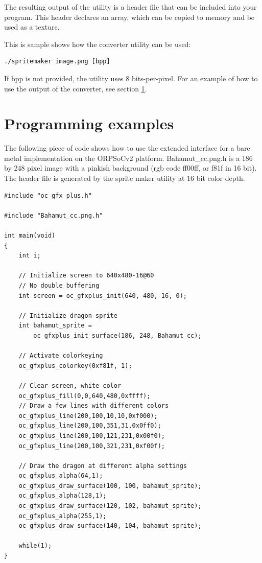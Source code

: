 \documentclass[10pt,a4paper]{article}
\begin{document}
The resulting output of the utility is a header file that can be included into your program. This header declares an array, which can be copied to memory and be used as a texture.

This is sample shows how the converter utility can be used:

\begin{lstlisting}
./spritemaker image.png [bpp]
\end{lstlisting}

If bpp is not provided, the utility uses 8 bits-per-pixel. For an example of how to use the output of the converter, see section \ref{sec:examples}.

\section{Programming examples}
\label{sec:examples}
The following piece of code shows how to use the extended interface for a bare metal implementation on the ORPSoCv2 platform. Bahamut\_cc.png.h is a 186 by 248 pixel image with a pinkish background (rgb code ff00ff, or f81f in 16 bit). The header file is generated by the sprite maker utility at 16 bit color depth.

\begin{lstlisting}
#include "oc_gfx_plus.h"

#include "Bahamut_cc.png.h"

int main(void)
{
    int i;

    // Initialize screen to 640x480-16@60
    // No double buffering
    int screen = oc_gfxplus_init(640, 480, 16, 0);

    // Initialize dragon sprite
    int bahamut_sprite =
        oc_gfxplus_init_surface(186, 248, Bahamut_cc);

    // Activate colorkeying
    oc_gfxplus_colorkey(0xf81f, 1);

    // Clear screen, white color
    oc_gfxplus_fill(0,0,640,480,0xffff);
    // Draw a few lines with different colors
    oc_gfxplus_line(200,100,10,10,0xf000);
    oc_gfxplus_line(200,100,351,31,0x0ff0);
    oc_gfxplus_line(200,100,121,231,0x00f0);
    oc_gfxplus_line(200,100,321,231,0xf00f);
    
    // Draw the dragon at different alpha settings
    oc_gfxplus_alpha(64,1);
    oc_gfxplus_draw_surface(100, 100, bahamut_sprite);
    oc_gfxplus_alpha(128,1);
    oc_gfxplus_draw_surface(120, 102, bahamut_sprite);
    oc_gfxplus_alpha(255,1);
    oc_gfxplus_draw_surface(140, 104, bahamut_sprite);

    while(1);
}
\end{lstlisting}


%
%
\end{document}
